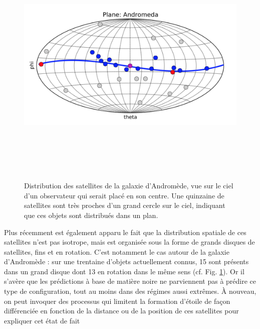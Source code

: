 \begin{figure}[htbp]
	\centering
		\includegraphics[height=12cm]{figs/planM31.png}
	\caption[Distribution des satellites de la galaxie d'Andromède]{Distribution des satellites de la galaxie d'Andromède, vue sur le ciel d'un observateur qui serait placé en son centre. Une quinzaine de satellites sont très proches d'un grand cercle sur le ciel, indiquant que ces objets sont distribués dans un plan.} 
	\label{f:planM31}
\end{figure}

Plus récemment est également apparu le fait que la distribution spatiale de ces satellites n'est pas isotrope, mais est organisée sous la forme de grands disques de satellites, fins et en rotation. C'est notamment le cas autour de la galaxie d'Andromède : sur une trentaine d'objets actuellement connus, 15 sont présents dans un grand disque dont 13 en rotation dans le même sens (cf. Fig. \ref{f:planM31}). Or il s'avère que les prédictions à base de matière noire ne parviennent pas à prédire ce type de configuration, tout au moins dans des régimes aussi extrêmes.  À nouveau, on peut invoquer des processus qui limitent la formation d'étoile de façon différenciée en fonction de la distance ou de la position de ces satellites pour expliquer cet état de fait 

